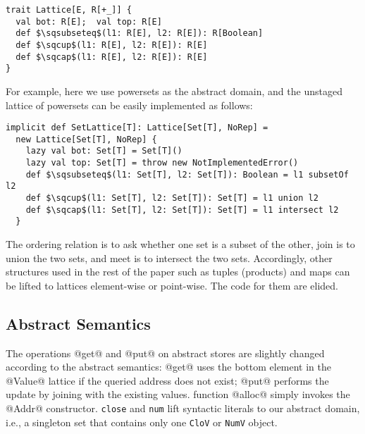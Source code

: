 \begin{lstlisting}
trait Lattice[E, R[+_]] {
  val bot: R[E];  val top: R[E]
  def $\sqsubseteq$(l1: R[E], l2: R[E]): R[Boolean]
  def $\sqcup$(l1: R[E], l2: R[E]): R[E]
  def $\sqcap$(l1: R[E], l2: R[E]): R[E]
}
\end{lstlisting}

For example, here we use powersets as the abstract domain, and the unstaged
lattice of powersets can be easily implemented as follows:

\begin{lstlisting}
implicit def SetLattice[T]: Lattice[Set[T], NoRep] = 
  new Lattice[Set[T], NoRep] {
    lazy val bot: Set[T] = Set[T]()
    lazy val top: Set[T] = throw new NotImplementedError()
    def $\sqsubseteq$(l1: Set[T], l2: Set[T]): Boolean = l1 subsetOf l2
    def $\sqcup$(l1: Set[T], l2: Set[T]): Set[T] = l1 union l2
    def $\sqcap$(l1: Set[T], l2: Set[T]): Set[T] = l1 intersect l2
  }
\end{lstlisting}

The ordering relation is to ask whether one set is a subset of the other, 
join is to union the two sets, and meet is to intersect the two sets.
Accordingly, other structures used in the rest of the paper such as tuples 
(products) and maps can be lifted to lattices element-wise or point-wise.
The code for them are elided.

\subsection{Abstract Semantics}

The operations @get@ and @put@ on abstract stores are slightly changed according
to the abstract semantics: @get@ uses the bottom element in the @Value@ lattice
if the queried address does not exist; @put@ performs the update by joining with
the existing values. function @alloc@ simply invokes the @Addr@ constructor.
\texttt{close} and \texttt{num} lift syntactic literals to our abstract domain,
i.e., a singleton set that contains only one \texttt{CloV} or \texttt{NumV}
object.


